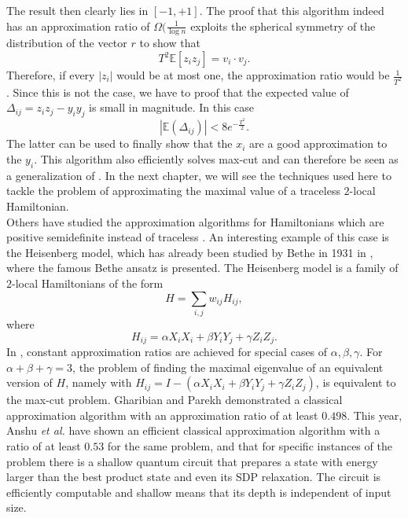 The result then clearly lies in $\left[ -1,+1\right]$.
The proof that this algorithm indeed has an approximation ratio of $\Omega(\frac{1}{\log{}n}$ exploits the spherical symmetry of the distribution of the vector $r$ to show that \[
T^2\mathbb{E}\left[ z_iz_j \right] = v_i\cdot v_j
.\]
Therefore, if every $\left| z_i \right| $ would be at most one, the approximation ratio would be $\frac{1}{T^2}$.
Since this is not the case, we have to proof that the expected value of $\Delta_{ij}=z_iz_j - y_iy_j$ is small in magnitude.
In this case \[
	\left|\mathbb{E}(\Delta_{ij})\right|<8e^{-\frac{T^2}{2}}
.\]
The latter can be used to finally show that the $x_i$ are a good approximation to the $y_i$.
This algorithm also efficiently solves max-cut and can therefore be seen as a generalization of \cite{goemans95}.
In the next chapter, we will see the techniques used here to tackle the problem of approximating the maximal value of a traceless $2$-local Hamiltonian.\\
Others have studied the approximation algorithms for Hamiltonians which are positive semidefinite instead of traceless \cite{gharibian19,anshu20,brandao14}.
An interesting example of this case is the Heisenberg model, which has already been studied by Bethe in 1931 in \cite{bethe31}, where the famous Bethe ansatz is presented.
The Heisenberg model is a family of $2$-local Hamiltonians of the form \[
H=\sum_{i,j} w_{ij}H_{ij}
,\] where \[
H_{ij}=\alpha X_iX_i + \beta Y_iY_j + \gamma Z_iZ_j
.\]
In \cite{gharibian19}, constant approximation ratios are achieved for special cases of $\alpha, \beta, \gamma$.
For $\alpha+\beta+\gamma=3$, the problem of finding the maximal eigenvalue of an equivalent version of $H$, namely with  $H_{ij}=I-(\alpha X_iX_i + \beta Y_iY_j + \gamma Z_iZ_j)$, is equivalent to the max-cut problem.
Gharibian and Parekh demonstrated a classical approximation algorithm with an approximation ratio of at least $0.498$.
This year, Anshu \emph{et al.}\cite{anshu20} have shown an efficient classical approximation algorithm with a ratio of at least $0.53$ for the same problem, and that for specific instances of the problem there is a shallow quantum circuit that prepares a state with energy larger than the best product state and even its SDP relaxation.
The circuit is efficiently computable and shallow means that its depth is independent of input size.
